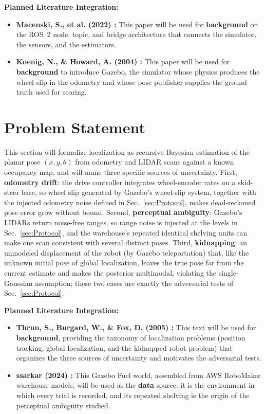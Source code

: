 \documentclass[conf]{new-aiaa}
\begin{document}
\vspace{0.5em}\noindent\textbf{Planned Literature Integration:}
\begin{itemize}
    \item \textbf{Macenski, S., et al. (2022) \cite{macenski2022ros2}:} This paper will be used for \textbf{background} on the ROS~2 node, topic, and bridge architecture that connects the simulator, the sensors, and the estimators.
    \item \textbf{Koenig, N., \& Howard, A. (2004) \cite{koenig2004design}:} This paper will be used for \textbf{background} to introduce Gazebo, the simulator whose physics produces the wheel slip in the odometry and whose pose publisher supplies the ground truth used for scoring.
\end{itemize}

\section{Problem Statement}\label{sec:Problem-Statement}
This section will formalize localization as recursive Bayesian estimation of the planar pose $(x, y, \theta)$ from odometry and LIDAR scans against a known occupancy map, and will name three specific sources of uncertainty. First, \textbf{odometry drift}: the drive controller integrates wheel-encoder rates on a skid-steer base, so wheel slip generated by Gazebo's wheel-slip system, together with the injected odometry noise defined in Sec.~\ref{sec:Protocol}, makes dead-reckoned pose error grow without bound. Second, \textbf{perceptual ambiguity}: Gazebo's LIDARs return noise-free ranges, so range noise is injected at the levels in Sec.~\ref{sec:Protocol}, and the warehouse's repeated identical shelving units can make one scan consistent with several distinct poses. Third, \textbf{kidnapping}: an unmodeled displacement of the robot (by Gazebo teleportation) that, like the unknown initial pose of global localization, leaves the true pose far from the current estimate and makes the posterior multimodal, violating the single-Gaussian assumption; these two cases are exactly the adversarial tests of Sec.~\ref{sec:Protocol}.

\vspace{0.5em}\noindent\textbf{Planned Literature Integration:}
\begin{itemize}
    \item \textbf{Thrun, S., Burgard, W., \& Fox, D. (2005) \cite{thrun2005probabilistic}:} This text will be used for \textbf{background}, providing the taxonomy of localization problems (position tracking, global localization, and the kidnapped robot problem) that organizes the three sources of uncertainty and motivates the adversarial tests.
    \item \textbf{ssarkar (2024) \cite{ssarkar2024warehouse}:} This Gazebo Fuel world, assembled from AWS RoboMaker warehouse models, will be used as the \textbf{data} source: it is the environment in which every trial is recorded, and its repeated shelving is the origin of the perceptual ambiguity studied.
\end{itemize}
\end{document}
